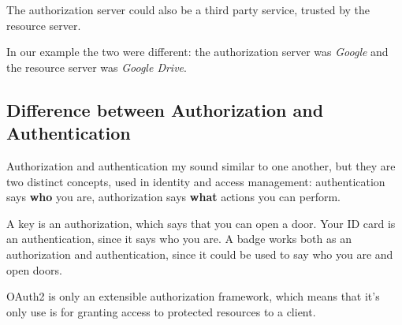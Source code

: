 The authorization server could also be a third party service, trusted by the
resource server.

In our example the two were different: the authorization server was
\textit{Google} and the resource server was \textit{Google Drive}.

\subsection{Difference between Authorization and Authentication}
Authorization and authentication my sound similar to one another, but they are
two distinct concepts, used in identity and access management:
authentication says \textbf{who} you are, authorization says \textbf{what}
actions you can perform.

A key is an authorization, which says that you can open a door. Your ID card is
an authentication, since it says who you are.
A badge works both as an authorization and authentication, since it could be
used to say who you are and open doors.

OAuth2 is only an extensible authorization framework, which means that it's
only use is for granting access to protected resources to a client.
